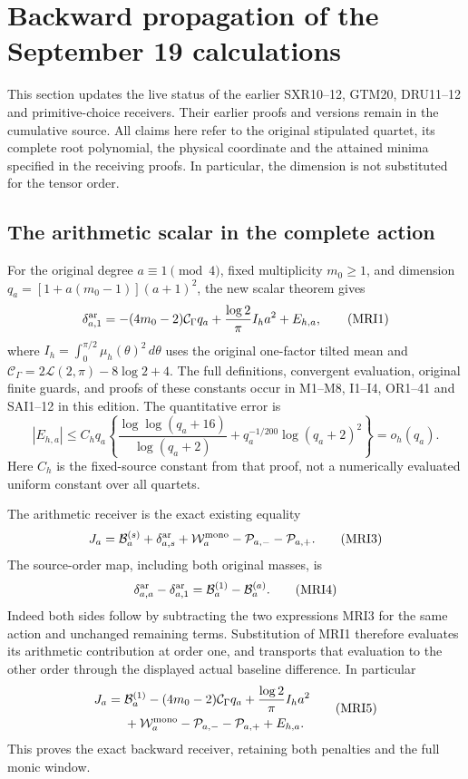 \section{Backward propagation of the September 19 calculations}
\label{sec:multi-intake-receiver}

This section updates the live status of the earlier SXR10--12, GTM20,
DRU11--12 and primitive-choice receivers. Their earlier proofs and
versions remain in the cumulative source. All claims here refer to the
original stipulated quartet, its complete root polynomial, the physical
coordinate and the attained minima specified in the receiving proofs.
In particular, the dimension is not substituted for the tensor order.

\subsection{The arithmetic scalar in the complete action}
For the original degree $a\equiv1\pmod4$, fixed multiplicity $m_0\ge1$,
and dimension $q_a=[1+a(m_0-1)](a+1)^2$, the new scalar theorem gives
\[
 \delta_{a,1}^{\rm ar}
 =-(4m_0-2)\mathcal C_\Gamma q_a
       +\frac{\log2}{\pi}I_h a^2+E_{h,a},
 \tag{MRI1}
\]
where $I_h=\int_0^{\pi/2}\mu_h(\theta)^2\,d\theta$ uses the original
one-factor tilted mean and
$\mathcal C_\Gamma=2\mathcal L(2,\pi)-8\log2+4$.
The full definitions, convergent evaluation, original finite guards,
and proofs of these constants occur in M1--M8, I1--I4, OR1--41 and
SAI1--12 in this edition. The quantitative error is
\[
 |E_{h,a}|\le C_hq_a
 \left\{\frac{\log\log(q_a+16)}{\log(q_a+2)}
       +q_a^{-1/200}\log(q_a+2)^2\right\}=o_h(q_a).
 \tag{MRI2}
\]
Here $C_h$ is the fixed-source constant from that proof, not a
numerically evaluated uniform constant over all quartets.

The arithmetic receiver is the exact existing equality
\[
 J_a=\mathcal B_a^{(s)}+\delta_{a,s}^{\rm ar}
               +\mathcal W_a^{\rm mono}-\mathcal P_{a,-}-\mathcal P_{a,+}.
 \tag{MRI3}
\]
The source-order map, including both original masses, is
\[
 \delta_{a,a}^{\rm ar}-\delta_{a,1}^{\rm ar}
     =\mathcal B_a^{(1)}-\mathcal B_a^{(a)}.
 \tag{MRI4}
\]
Indeed both sides follow by subtracting the two expressions MRI3 for
the same action and unchanged remaining terms. Substitution of MRI1
therefore evaluates its arithmetic contribution at order one, and
transports that evaluation to the other order through the displayed
actual baseline difference. In particular
\[
 \begin{split}
 J_a={}&\mathcal B_a^{(1)}-(4m_0-2)\mathcal C_\Gamma q_a
       +\frac{\log2}{\pi}I_h a^2\\
      &+\mathcal W_a^{\rm mono}-\mathcal P_{a,-}-\mathcal P_{a,+}+E_{h,a}.
 \end{split}\tag{MRI5}
\]
This proves the exact backward receiver, retaining both penalties and
the full monic window.

